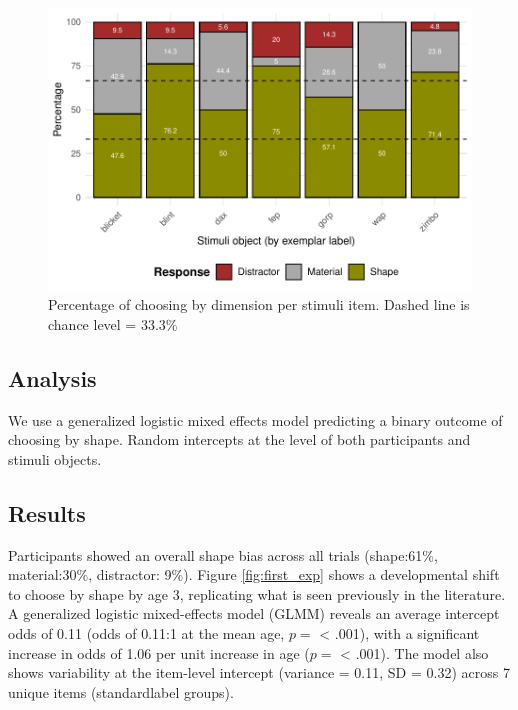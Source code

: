 \documentclass[10pt, letterpaper]{article}
\newenvironment{CodeChunk}{}{}
\begin{document}
\begin{CodeChunk}
\begin{figure}[tb]
\includegraphics[width=1\linewidth]{figs/first_exp_stim-1} \caption[Percentage of choosing by dimension per stimuli item]{Percentage of choosing by dimension per stimuli item. Dashed line is chance level = 33.3\% }\label{fig:first_exp_stim}
\end{figure}
\end{CodeChunk}

\hypertarget{analysis}{%
\subsection{Analysis}\label{analysis}}

We use a generalized logistic mixed effects model predicting a binary
outcome of choosing by shape. Random intercepts at the level of both
participants and stimuli objects.

\hypertarget{results}{%
\subsection{Results}\label{results}}

Participants showed an overall shape bias across all trials (shape:61\%,
material:30\%, distractor: 9\%). Figure \ref{fig:first_exp} shows a
developmental shift to choose by shape by age 3, replicating what is
seen previously in the literature.\\
A generalized logistic mixed-effects model (GLMM) reveals an average
intercept odds of 0.11 (odds of 0.11:1 at the mean age, \(p=\)
\textless{} .001), with a significant increase in odds of 1.06 per unit
increase in age (\(p=\) \textless{} .001). The model also shows
variability at the item-level intercept (variance = 0.11, SD = 0.32)
across 7 unique items (standardlabel groups).
\end{document}
